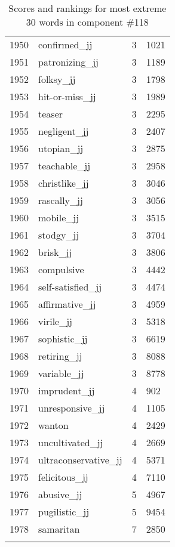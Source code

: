 \begin{longtable}[!htbp]{| rlr@{.}l |}
    1950 & confirmed\_jj & 3 & 1021 \\
    1951 & patronizing\_jj & 3 & 1189 \\
    1952 & folksy\_jj & 3 & 1798 \\
    1953 & hit-or-miss\_jj & 3 & 1989 \\
    1954 & teaser & 3 & 2295 \\
    1955 & negligent\_jj & 3 & 2407 \\
    1956 & utopian\_jj & 3 & 2875 \\
    1957 & teachable\_jj & 3 & 2958 \\
    1958 & christlike\_jj & 3 & 3046 \\
    1959 & rascally\_jj & 3 & 3056 \\
    1960 & mobile\_jj & 3 & 3515 \\
    1961 & stodgy\_jj & 3 & 3704 \\
    1962 & brisk\_jj & 3 & 3806 \\
    1963 & compulsive & 3 & 4442 \\
    1964 & self-satisfied\_jj & 3 & 4474 \\
    1965 & affirmative\_jj & 3 & 4959 \\
    1966 & virile\_jj & 3 & 5318 \\
    1967 & sophistic\_jj & 3 & 6619 \\
    1968 & retiring\_jj & 3 & 8088 \\
    1969 & variable\_jj & 3 & 8778 \\
    1970 & imprudent\_jj & 4 & 902 \\
    1971 & unresponsive\_jj & 4 & 1105 \\
    1972 & wanton & 4 & 2429 \\
    1973 & uncultivated\_jj & 4 & 2669 \\
    1974 & ultraconservative\_jj & 4 & 5371 \\
    1975 & felicitous\_jj & 4 & 7110 \\
    1976 & abusive\_jj & 5 & 4967 \\
    1977 & pugilistic\_jj & 5 & 9454 \\
    1978 & samaritan & 7 & 2850 \\
    \hline
    \caption{Scores and rankings for most extreme 30 words in component \#118} \\
\end{longtable}
